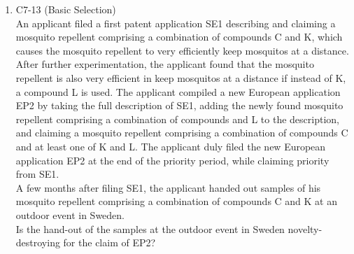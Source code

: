 \documentclass{report}
\newcommand{\T}{--- \textbf{True} }
\newcommand{\F}{--- \textbf{False} }
\begin{document}
\begin{enumerate}[label=\textbf{Answer \arabic*}]
\begin{enumerate}[label=\textbf{Answer \arabic*}]
    \vspace{1em}
    A further European application EP3 claims priority from FR1, DE1, EP1 and EP2.
    
    \vspace{0.5em}
    Claim 1 of the European patent application EP3 defines the combination of features C and D. \\
    Claim 2 of the European patent application EP3 defines individual feature D.
    
    \vspace{0.5em}
    The filing date of EP3 is 17 December 2023.
    
    \vspace{1em}
    For each of the statements below, indicate whether the statement is true or false.
    \begin{enumerate}[label=(\alph*), resume]
        \item The effective date of claim 1 of EP3 is the filing date of EP1. \T
        \item The effective date of claim 1 of EP3 is the filing date of EP3. \F
        \item The effective date of claim 2 of EP3 is the filing date of DE1. \F
        \item The effective date of claim 2 of EP3 is the filing date of EP3. \T --- the \textit{first application} disclosing subject-matter \textsc{D} was \textsc{DE1}, and it is too late to claim it now (cannot do it off \textsc{EP1} or \textsc{EP2} as they were \textbf{not the first application} for the same invention/subject-matter. 
    \end{enumerate}

    \item %
    C7-13 (Basic Selection) \\
    An applicant filed a first patent application SE1 describing and claiming a mosquito repellent comprising a combination of compounds C and K, which causes the mosquito repellent to very efficiently keep mosquitos at a distance. After further experimentation, the applicant found that the mosquito repellent is also very efficient in keep mosquitos at a distance if instead of K, a compound L is used. The applicant compiled a new European application EP2 by taking the full description of SE1, adding the newly found mosquito repellent comprising a combination of compounds and L to the description, and claiming a mosquito repellent comprising a combination of compounds C and at least one of K and L. The applicant duly filed the new European application EP2 at the end of the priority period, while claiming priority from SE1. \\
    A few months after filing SE1, the applicant handed out samples of his mosquito repellent comprising a combination of compounds C and K at an outdoor event in Sweden. \\
    Is the hand-out of the samples at the outdoor event in Sweden novelty-destroying for the claim of EP2?



\end{enumerate}
\end{enumerate}
\end{document}
